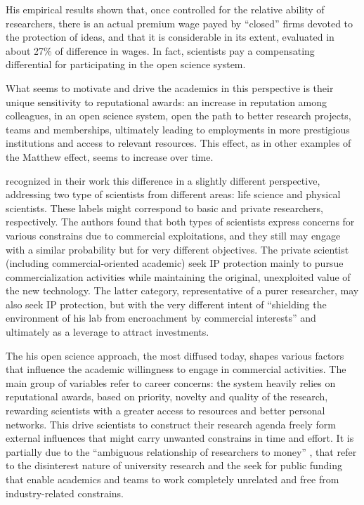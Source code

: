 His empirical results shown that, once controlled for the relative ability of researchers, there is an actual premium wage payed by \enquote{closed} firms devoted to the protection of ideas, and that it is considerable in its extent, evaluated in about 27\% of difference in wages. In fact, scientists pay a compensating differential for participating in the open science system. 

What seems to motivate and drive the academics in this perspective is their unique sensitivity to reputational awards: an increase in reputation among colleagues, in an open science system, open the path to better research projects, teams and memberships, ultimately leading to employments in more prestigious institutions and access to relevant resources. This effect, as in other examples of the Matthew effect, seems to increase over time.

\citet{OwenSmith2001} recognized in their work this difference in a slightly different perspective, addressing two type of scientists from different areas: life science and physical scientists. These labels might correspond to basic and private researchers, respectively. The authors found that both types of scientists express concerns for various constrains due to commercial exploitations, and they still may engage with a similar probability but for very different objectives. The private scientist (including commercial-oriented academic) seek IP protection mainly to pursue commercialization activities while maintaining the original, unexploited value of the new technology. The latter category, representative of a purer researcher, may also seek IP protection, but with the very different intent of \enquote{shielding the environment of his lab from encroachment by commercial interests} and ultimately as a leverage to attract investments.

The his open science approach, the most diffused today, shapes various factors that influence the academic willingness to engage in commercial activities. The main group of variables refer to career concerns: the system heavily relies on reputational awards, based on priority, novelty and quality of the research, rewarding scientists with a greater access to resources and better personal networks. This drive scientists to construct their research agenda freely form external influences that might carry unwanted constrains in time and effort. It is partially due to the \enquote{ambiguous relationship of researchers to money} \citep{OShea2004}, that refer to the disinterest nature of university research and the seek for public funding that enable academics and teams to work completely unrelated and free from industry-related constrains. 

